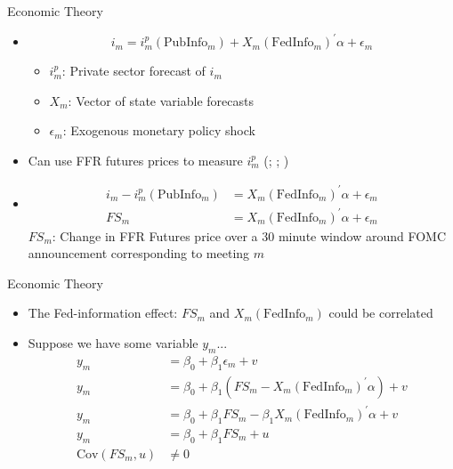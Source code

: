 \documentclass[xcolor=dvipsnames, compress, t]{beamer}
\begin{document}
	\begin{frame}{Economic Theory}
		\begin{itemize}
			\item<2-> \[
			i_m = i_m^p(\text{PubInfo}_m) + X_m(\text{FedInfo}_m)^\prime \alpha + \epsilon_m 
			\]
			\begin{itemize}
				\item<2-> \(i_m^p\): Private sector forecast of \(i_m\)
				\item<2->\(X_m\): Vector of state variable forecasts
				\item<2-> \(\epsilon_m\): Exogenous monetary policy shock
			\end{itemize}
			\item<3-> Can use FFR futures prices to measure \(i_m^p\) (\cite{Gurkaynak2011}; \cite{Gertler2015}; \cite{Nakamura2018})
			\item<4-> 
				\begin{align*}
					i_m - i_m^p(\text{PubInfo}_m) &= X_m(\text{FedInfo}_m)^\prime \alpha + \epsilon_m \\
					FS_m &= X_m(\text{FedInfo}_m)^\prime \alpha + \epsilon_m 
				\end{align*}
			\(FS_m\): Change in FFR Futures price over a 30 minute window around FOMC announcement corresponding to meeting \(m\)
		\end{itemize}
	\end{frame}
	\begin{frame}{Economic Theory}
		\begin{itemize}
			\item<2-> The Fed-information effect: \(FS_m\) and \(X_m(\text{FedInfo}_m)\) could be correlated
			\item<3-> Suppose we have some variable \(y_m\)...
			\begin{align*}				
				y_m &= \beta_0 + \beta_1 \epsilon_m  + v \\
				y_m &= \beta_0 + \beta_1(FS_m - X_m(\text{FedInfo}_m)^\prime \alpha )  + v \\
				y_m &= \beta_0 + \beta_1FS_m - \beta_1 X_m(\text{FedInfo}_m)^\prime \alpha + v \\
				y_m &= \beta_0 + \beta_1FS_m + u \\ 
				\mathrm{Cov}(FS_m, u) &\neq 0 
			\end{align*}
		\end{itemize}
	\end{frame}
\end{document}
